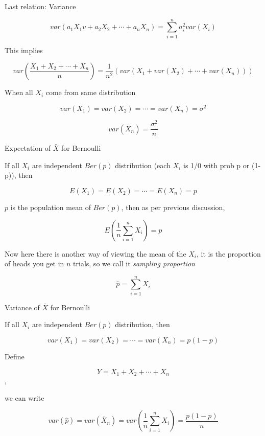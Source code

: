 \documentclass{beamer}\usepackage[]{graphicx}\usepackage[]{color}
\begin{document}
\begin{frame}{Last relation: Variance}

$$ var(a_1X_1v+ a_2 X_2 + \cdots + a_nX_n) = \sum_{i=1}^{n} a^2_{i} var (X_{i}) $$ 

This implies 

$$ var \left (\frac{X_1 + X_2 + \cdots + X_{n}}{n} \right ) = \frac{1}{n^2} \left (var(X_1 + var(X_2) + \cdots + var(X_n)) \right ) $$ 

When all $X_i$ come from same distribution

$$ var(X_1) = var(X_2) = \cdots = var(X_n) = \sigma^2 $$

$$ var \left (\bar{X}_{n} \right ) = \frac{\sigma^2}{n} $$

\end{frame}

\begin{frame}{Expectation of $\bar{X}$ for Bernoulli}

If all $X_{i}$ are independent $Ber(p)$ distribution (each $X_i$ is 1/0 with prob p or (1-p)), then 

$$ E(X_1) = E(X_2) = \cdots = E(X_n) = p $$

$p$ is the population mean of $Ber(p)$, then as per previous discussion,

$$ E(\frac{1}{n} \sum_{i=1}^{n} X_i) = p $$

Now here there is another way of viewing the mean of the $X_i$, it is the proportion of heads you get in $n$ trials, so we call it \textit{sampling proportion} 

$$ \hat{p} = \sum_{i=1}^{n} X_i $$

\end{frame}


\begin{frame}{Variance of $\bar{X}$ for Bernoulli}

If all $X_{i}$ are independent $Ber(p)$ distribution, then 

$$ var(X_1) = var(X_2) = \cdots = var(X_n) = p(1-p) $$ \pause \newline

Define 

$$ Y = X_1 + X_2 + \cdots + X_n$$, \pause

we can write

$$ var(\hat{p}) = var (\bar{X}_{n}) = var \left (\frac{1}{n} \sum_{i=1}^{n} X_{i} \right) = \frac{p(1-p)}{n} $$

\end{frame}
\end{document}
